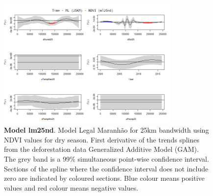 \begin{table}


\begin{figure}[H]
 \centering
        \centering
        \includegraphics[width=0.8\textwidth]{ml25nd.png} %
        \caption[Model Legal Maranhão for 25km bandwidth using NDVI values for dry season. First derivative of the trends splines from the deforestation data Generalized Additive Model (GAM)]{\textbf{Model lm25nd}. Model Legal Maranhão for 25km bandwidth using NDVI values for dry season. First derivative of the trends splines from the deforestation data Generalized Additive Model (GAM). The grey band is a 99\% simultaneous point-wise confidence interval. Sections of the spline where the confidence interval does not include zero are indicated by coloured sections. Blue colour means positive values and red colour means negative values.}
        \centering
\end{figure}
\end{table}

